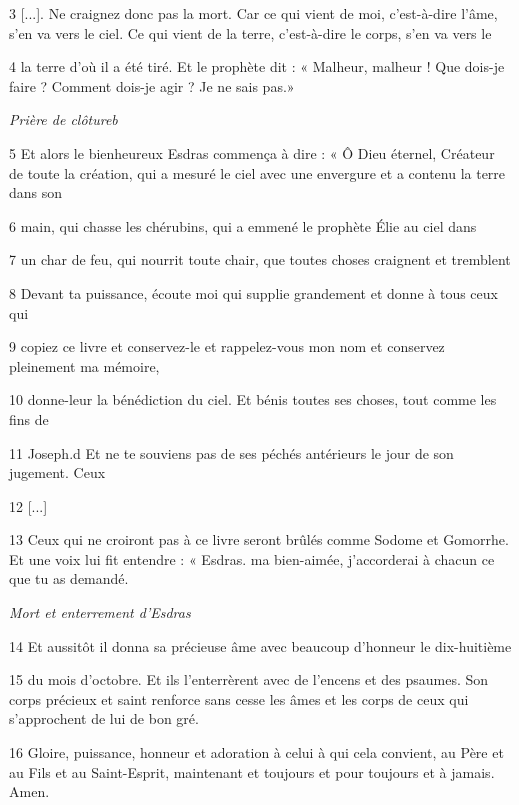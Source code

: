 \par 3 [...]. Ne craignez donc pas la mort. Car ce qui vient de moi, c'est-à-dire l'âme, s'en va vers le ciel. Ce qui vient de la terre, c'est-à-dire le corps, s'en va vers le

\par 4 la terre d'où il a été tiré. Et le prophète dit : « Malheur, malheur ! Que dois-je faire ? Comment dois-je agir ? Je ne sais pas.»

\par \textit{Prière de clôtureb}

\par 5 Et alors le bienheureux Esdras commença à dire : « Ô Dieu éternel, Créateur de toute la création, qui a mesuré le ciel avec une envergure et a contenu la terre dans son

\par 6 main, qui chasse les chérubins, qui a emmené le prophète Élie au ciel dans

\par 7 un char de feu, qui nourrit toute chair, que toutes choses craignent et tremblent

\par 8 Devant ta puissance, écoute moi qui supplie grandement et donne à tous ceux qui

\par 9 copiez ce livre et conservez-le et rappelez-vous mon nom et conservez pleinement ma mémoire,

\par 10 donne-leur la bénédiction du ciel. Et bénis toutes ses choses, tout comme les fins de

\par 11 Joseph.d Et ne te souviens pas de ses péchés antérieurs le jour de son jugement. Ceux

\par 12 [...]

\par 13 Ceux qui ne croiront pas à ce livre seront brûlés comme Sodome et Gomorrhe. Et une voix lui fit entendre : « Esdras. ma bien-aimée, j’accorderai à chacun ce que tu as demandé.

\par \textit{Mort et enterrement d'Esdras}

\par 14 Et aussitôt il donna sa précieuse âme avec beaucoup d'honneur le dix-huitième

\par 15 du mois d'octobre. Et ils l'enterrèrent avec de l'encens et des psaumes. Son corps précieux et saint renforce sans cesse les âmes et les corps de ceux qui s’approchent de lui de bon gré.

\par 16 Gloire, puissance, honneur et adoration à celui à qui cela convient, au Père et au Fils et au Saint-Esprit, maintenant et toujours et pour toujours et à jamais. Amen.

